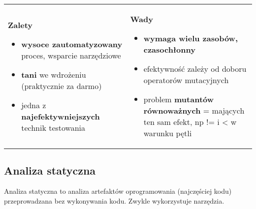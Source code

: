 \documentclass[../main.tex]{subfiles}
\begin{document}
    \begin{table}[H]
        \begin{center}
            \begin{tabular}{p{8cm} p{8cm}}
                \textbf{Zalety}
                \begin{itemize}
                    \item \textbf{wysoce zautomatyzowany} proces, wsparcie narzędziowe
                    \item \textbf{tani} we wdrożeniu (praktycznie za darmo)
                    \item jedna z \textbf{najefektywniejszych} technik testowania
                \end{itemize}
                &
                \textbf{Wady}
                \begin{itemize}
                    \item \textbf{wymaga wielu zasobów, czasochłonny}
                    \item efektywność zależy od doboru operatorów mutacyjnych
                    \item problem \textbf{mutantów równoważnych} = mających ten sam efekt, np != i < w warunku pętli
                \end{itemize}
            \end{tabular}
        \end{center}
    \end{table}

    \subsection{Analiza statyczna}
    Analiza statyczna to analiza artefaktów oprogramowania (najczęściej kodu) przeprowadzana bez wykonywania kodu.
    Zwykle wykorzystuje narzędzia.
\end{document}
